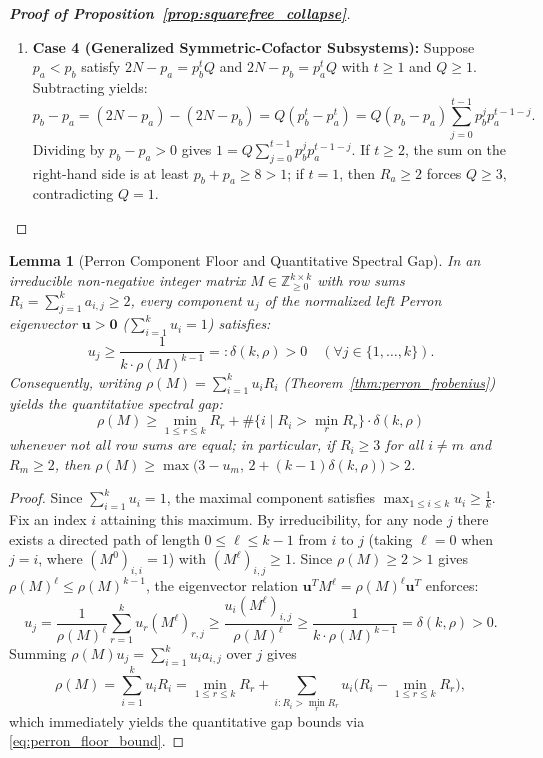 \documentclass[11pt,a4paper]{article}
\newtheorem{lemma}[theorem]{Lemma}
\theoremstyle{definition}
\begin{document}
\begin{proof}[\textbf{Proof of Proposition~\ref{prop:squarefree_collapse}}]
\begin{enumerate}
    \item \textbf{Case 4 (Generalized Symmetric-Cofactor Subsystems):}  
    Suppose $p_a < p_b$ satisfy $2N - p_a = p_b^t Q$ and $2N - p_b = p_a^t Q$ with $t \ge 1$ and $Q \ge 1$. Subtracting yields:
    \begin{equation}
    \label{eq:dense_diff}
    p_b - p_a = (2N - p_a) - (2N - p_b) = Q(p_b^t - p_a^t) = Q(p_b - p_a) \sum_{j=0}^{t-1} p_b^j p_a^{t-1-j}.
    \end{equation}
    Dividing by $p_b - p_a > 0$ gives $1 = Q \sum_{j=0}^{t-1} p_b^j p_a^{t-1-j}$. If $t \ge 2$, the sum on the right-hand side is at least $p_b + p_a \ge 8 > 1$; if $t = 1$, then $R_a \ge 2$ forces $Q \ge 3$, contradicting $Q = 1$.
\end{enumerate}
\end{proof}

\begin{lemma}[Perron Component Floor and Quantitative Spectral Gap]
\label{lem:perron_floor}
In an irreducible non-negative integer matrix $M \in \mathbb{Z}_{\ge 0}^{k \times k}$ with row sums $R_i = \sum_{j=1}^k a_{i,j} \ge 2$, every component $u_j$ of the normalized left Perron eigenvector $\mathbf{u} > \mathbf{0}$ ($\sum_{i=1}^k u_i = 1$) satisfies:
\begin{equation}
\label{eq:perron_floor_bound}
u_j \ge \frac{1}{k \cdot \rho(M)^{k-1}} =: \delta(k, \rho) > 0 \quad (\forall j \in \{1, \dots, k\}).
\end{equation}
Consequently, writing $\rho(M) = \sum_{i=1}^k u_i R_i$ (Theorem~\ref{thm:perron_frobenius}) yields the quantitative spectral gap:
\[
\rho(M) \ge \min_{1 \le r \le k} R_r + \#\{i \mid R_i > \min_r R_r\} \cdot \delta(k, \rho)
\]
whenever not all row sums are equal; in particular, if $R_i \ge 3$ for all $i \ne m$ and $R_m \ge 2$, then $\rho(M) \ge \max\bigl(3 - u_m, \, 2 + (k-1)\delta(k, \rho)\bigr) > 2$.
\end{lemma}
\begin{proof}
Since $\sum_{i=1}^k u_i = 1$, the maximal component satisfies $\max_{1 \le i \le k} u_i \ge \frac{1}{k}$. Fix an index $i$ attaining this maximum. By irreducibility, for any node $j$ there exists a directed path of length $0 \le \ell \le k - 1$ from $i$ to $j$ (taking $\ell = 0$ when $j = i$, where $(M^0)_{i,i} = 1$) with $(M^\ell)_{i,j} \ge 1$. Since $\rho(M) \ge 2 > 1$ gives $\rho(M)^\ell \le \rho(M)^{k-1}$, the eigenvector relation $\mathbf{u}^T M^\ell = \rho(M)^\ell \mathbf{u}^T$ enforces:
\[
u_j = \frac{1}{\rho(M)^\ell} \sum_{r=1}^k u_r (M^\ell)_{r,j} \ge \frac{u_i (M^\ell)_{i,j}}{\rho(M)^\ell} \ge \frac{1}{k \cdot \rho(M)^{k-1}} = \delta(k, \rho) > 0.
\]
Summing $\rho(M) u_j = \sum_{i=1}^k u_i a_{i,j}$ over $j$ gives
\[
\rho(M) = \sum_{i=1}^k u_i R_i = \min_{1 \le r \le k} R_r + \sum_{i : R_i > \min_r R_r} u_i\bigl(R_i - \min_{1 \le r \le k} R_r\bigr),
\]
which immediately yields the quantitative gap bounds via \eqref{eq:perron_floor_bound}.
\end{proof}
\end{document}
